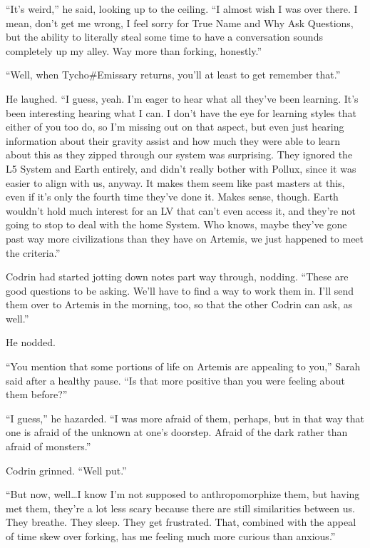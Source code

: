 ``It's weird,'' he said, looking up to the ceiling. ``I almost wish I was over there. I mean, don't get me wrong, I feel sorry for True Name and Why Ask Questions, but the ability to literally steal some time to have a conversation sounds completely up my alley. Way more than forking, honestly.''

``Well, when Tycho\#Emissary returns, you'll at least to get remember that.''

He laughed. ``I guess, yeah. I'm eager to hear what all they've been learning. It's been interesting hearing what I can. I don't have the eye for learning styles that either of you too do, so I'm missing out on that aspect, but even just hearing information about their gravity assist and how much they were able to learn about this as they zipped through our system was surprising. They ignored the L5 System and Earth entirely, and didn't really bother with Pollux, since it was easier to align with us, anyway. It makes them seem like past masters at this, even if it's only the fourth time they've done it. Makes sense, though. Earth wouldn't hold much interest for an LV that can't even access it, and they're not going to stop to deal with the home System. Who knows, maybe they've gone past way more civilizations than they have on Artemis, we just happened to meet the criteria.''

Codrin had started jotting down notes part way through, nodding. ``These are good questions to be asking. We'll have to find a way to work them in. I'll send them over to Artemis in the morning, too, so that the other Codrin can ask, as well.''

He nodded.

``You mention that some portions of life on Artemis are appealing to you,'' Sarah said after a healthy pause. ``Is that more positive than you were feeling about them before?''

``I guess,'' he hazarded. ``I was more afraid of them, perhaps, but in that way that one is afraid of the unknown at one's doorstep. Afraid of the dark rather than afraid of monsters.''

Codrin grinned. ``Well put.''

``But now, well\ldots I know I'm not supposed to anthropomorphize them, but having met them, they're a lot less scary because there are still similarities between us. They breathe. They sleep. They get frustrated. That, combined with the appeal of time skew over forking, has me feeling much more curious than anxious.''


